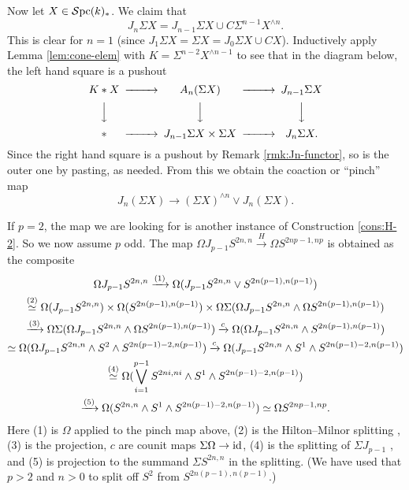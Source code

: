 \documentclass{amsart}
\numberwithin{proposition}{section}
\numberwithin{equation}{section}
\begin{document}
Now let $X \in \mathcal{S}\mathrm{pc}{}(k)_*$.
We claim that \[ J_n \Sigma X = J_{n-1} \Sigma X \cup C \Sigma^{n-1} X^{\wedge n}. \]
This is clear for $n=1$ (since $J_1 \Sigma X = \Sigma X = J_0 \Sigma X \cup CX$).
Inductively apply Lemma \ref{lem:cone-elem} with $K=\Sigma^{n-2} X^{\wedge n-1}$ to see that in the diagram below, the left hand square is a pushout
\begin{equation*}
\begin{CD}
K * X @>>> A_n(\Sigma X) @>>> J_{n-1} \Sigma X \\
@VVV          @VVV               @VVV \\
* @>>> J_{n-1} \Sigma X  \times \Sigma X @>>> J_n \Sigma X.
\end{CD}
\end{equation*}
Since the right hand square is a pushout by Remark \ref{rmk:Jn-functor}, so is the outer one by pasting, as needed.
From this we obtain the coaction or ``pinch'' map \[ J_n(\Sigma X) \to (\Sigma X)^{\wedge n} \vee J_n(\Sigma X). \]
\begin{construction} \label{cons:H-1}
If $p=2$, the map we are looking for is another instance of Construction \ref{cons:H-2}.
So we now assume $p$ odd.
The map $\Omega J_{p-1} S^{2n,n} \xrightarrow{H} \Omega S^{2np-1,np}$ is obtained as the composite
\begin{gather*} \Omega J_{p-1}S^{2n,n} \xrightarrow{(1)} \Omega(J_{p-1}S^{2n,n} \vee S^{2n(p-1),n(p-1)}) \\
  \stackrel{(2)}{\simeq} \Omega(J_{p-1}S^{2n,n}) \times \Omega(S^{2n(p-1),n(p-1)}) \times \Omega \Sigma (\Omega J_{p-1}S^{2n,n} \wedge \Omega S^{2n(p-1),n(p-1)}) \\
  \xrightarrow{(3)} \Omega \Sigma (\Omega J_{p-1}S^{2n,n} \wedge \Omega S^{2n(p-1),n(p-1)}) \xrightarrow{c} \Omega(\Omega J_{p-1}S^{2n,n} \wedge S^{2n(p-1),n(p-1)}) \\
  \simeq \Omega(\Omega J_{p-1}S^{2n,n} \wedge S^2 \wedge S^{2n(p-1)-2,n(p-1)}) \xrightarrow{c} \Omega(J_{p-1}S^{2n,n} \wedge S^1 \wedge S^{2n(p-1)-2,n(p-1)}) \\
  \stackrel{(4)}{\simeq} \Omega(\bigvee_{i=1}^{p-1} S^{2ni,ni} \wedge S^1 \wedge S^{2n(p-1)-2,n(p-1)}) \\
  \xrightarrow{(5)} \Omega (S^{2n,n} \wedge S^1 \wedge S^{2n(p-1)-2,n(p-1)}) \simeq \Omega S^{2np-1,np}. \end{gather*}
Here (1) is $\Omega$ applied to the pinch map above, (2) is the Hilton--Milnor splitting \cite[Theorem~3.1]{devalapurkar2019james}, (3) is the projection, $c$ are counit maps $\Sigma \Omega \to \operatorname{id}$, (4) is the splitting of $\Sigma J_{p-1}$ \cite[Proposition~5.8]{devalapurkar2019james}, and (5) is projection to the summand $\Sigma S^{2n,n}$ in the splitting.
(We have used that $p > 2$ and $n > 0$ to split off $S^2$ from $S^{2n(p-1),n(p-1)}$.)
\end{construction}
\end{document}
